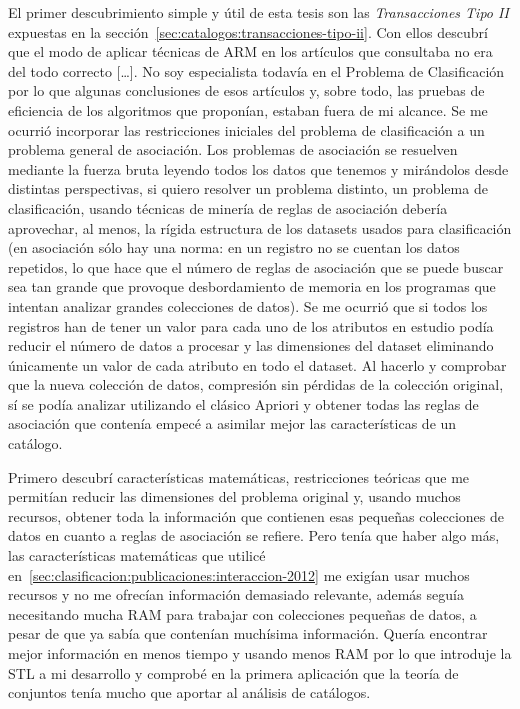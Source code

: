 El primer descubrimiento simple y útil de esta tesis son las \emph{Transacciones Tipo II} expuestas en la sección~\ref{sec:catalogos:transacciones-tipo-ii}. Con ellos descubrí que el modo de aplicar técnicas de ARM en los artículos que consultaba no era del todo correcto  [\ldots]. No soy especialista todavía en el Problema de Clasificación por lo que algunas conclusiones de esos artículos y, sobre todo, las pruebas de eficiencia de los algoritmos que proponían, estaban fuera de mi alcance. Se me ocurrió incorporar las restricciones iniciales del problema de clasificación a un problema general de asociación. Los problemas de asociación se resuelven mediante la fuerza bruta leyendo todos los datos que tenemos y mirándolos desde distintas perspectivas, si quiero resolver un problema distinto, un problema de clasificación, usando técnicas de minería de reglas de asociación debería aprovechar, al menos, la rígida estructura de los datasets usados para clasificación (en asociación sólo hay una norma: en un registro no se cuentan los datos repetidos, lo que hace que el número de reglas de asociación que se puede buscar sea tan grande que provoque desbordamiento de memoria en los programas que intentan analizar grandes colecciones de datos). Se me ocurrió que si todos los registros han de tener un valor para cada uno de los atributos en estudio podía reducir el número de datos a procesar y las dimensiones del dataset eliminando únicamente un valor de cada atributo en todo el dataset. Al hacerlo y comprobar que la nueva colección de datos, compresión sin pérdidas de la colección original, sí se podía analizar utilizando el clásico Apriori y obtener todas las reglas de asociación que contenía empecé a asimilar mejor las características de un catálogo.

Primero descubrí características matemáticas, restricciones teóricas que me permitían reducir las dimensiones del problema original y, usando muchos recursos, obtener toda la información que contienen esas pequeñas colecciones de datos en cuanto a reglas de asociación se refiere. Pero tenía que haber algo más, las características matemáticas que utilicé en~\ref{sec:clasificacion:publicaciones:interaccion-2012} me exigían usar muchos recursos y no me ofrecían información demasiado relevante, además seguía necesitando mucha RAM para trabajar con colecciones pequeñas de datos, a pesar de que ya sabía que contenían muchísima información. Quería encontrar mejor información en menos tiempo y usando menos RAM por lo que introduje la STL a mi desarrollo y comprobé en la primera aplicación que la teoría de conjuntos tenía mucho que aportar al análisis de catálogos.
